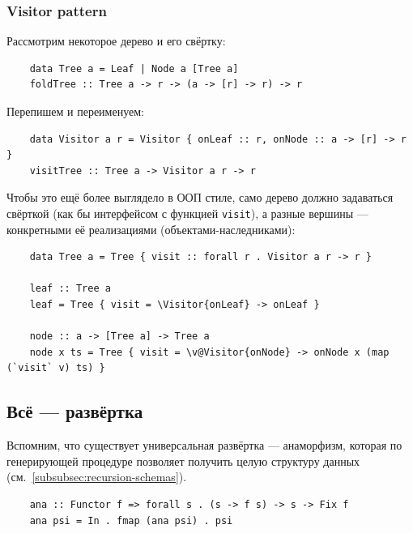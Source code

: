 \subsubsection{Visitor pattern} \label{subsubsec:visitor}

Рассмотрим некоторое дерево и его свёртку:
\begin{verbatim}
    data Tree a = Leaf | Node a [Tree a]
    foldTree :: Tree a -> r -> (a -> [r] -> r) -> r
\end{verbatim}

Перепишем и переименуем:
\begin{verbatim}
    data Visitor a r = Visitor { onLeaf :: r, onNode :: a -> [r] -> r }
    visitTree :: Tree a -> Visitor a r -> r
\end{verbatim}

Чтобы это ещё более выглядело в ООП стиле, само дерево должно задаваться свёрткой (как бы интерфейсом с функцией \texttt{visit}), а разные вершины --- конкретными её реализациями (объектами-наследниками):
\begin{verbatim}
    data Tree a = Tree { visit :: forall r . Visitor a r -> r }

    leaf :: Tree a
    leaf = Tree { visit = \Visitor{onLeaf} -> onLeaf }

    node :: a -> [Tree a] -> Tree a
    node x ts = Tree { visit = \v@Visitor{onNode} -> onNode x (map (`visit` v) ts) }
\end{verbatim}

\subsection{Всё --- развёртка} \label{subsec:all-unfolds}

Вспомним, что существует универсальная развёртка --- анаморфизм, которая по генерирующей процедуре позволяет получить целую структуру данных (см.~\ref{subsubsec:recursion-schemas}).
\begin{verbatim}
    ana :: Functor f => forall s . (s -> f s) -> s -> Fix f
    ana psi = In . fmap (ana psi) . psi
\end{verbatim}


